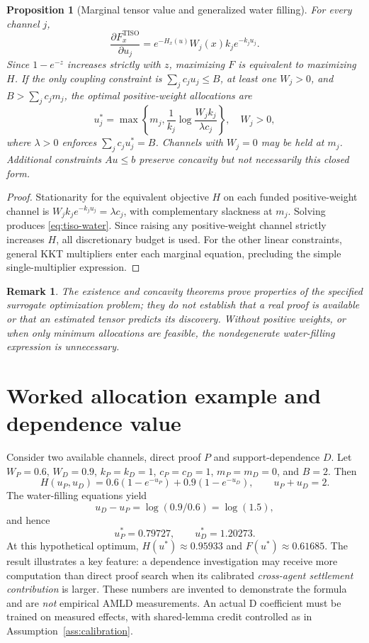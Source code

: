 \documentclass[11pt]{article}
\newtheorem{proposition}[definition]{Proposition}
\newtheorem{remark}[definition]{Remark}
\begin{document}
\begin{proposition}[Marginal tensor value and generalized water filling]\label{prop:tiso-water}
For every channel $j$,
\begin{equation}\label{eq:tiso-gradient}
\frac{\partial F_x^{\mathrm{TISO}}}{\partial u_j}
=e^{-H_x(u)}W_j(x)k_je^{-k_ju_j}.
\end{equation}
Since $1-e^{-z}$ increases strictly with $z$, maximizing $F$ is equivalent to maximizing $H$. If the only coupling constraint is $\sum_jc_ju_j\le B$, at least one $W_j>0$, and $B>\sum_jc_jm_j$, the optimal positive-weight allocations are
\begin{equation}\label{eq:tiso-water}
\boxed{\quad u_j^*=\max\!\left\{m_j,\frac1{k_j}\log\frac{W_jk_j}{\lambda c_j}\right\},\quad W_j>0,\quad}
\end{equation}
where $\lambda>0$ enforces $\sum_jc_ju_j^*=B$. Channels with $W_j=0$ may be held at $m_j$. Additional constraints $Au\le b$ preserve concavity but not necessarily this closed form.
\end{proposition}
\begin{proof}
Stationarity for the equivalent objective $H$ on each funded positive-weight channel is $W_jk_je^{-k_ju_j}=\lambda c_j$, with complementary slackness at $m_j$. Solving produces \eqref{eq:tiso-water}. Since raising any positive-weight channel strictly increases $H$, all discretionary budget is used. For the other linear constraints, general KKT multipliers enter each marginal equation, precluding the simple single-multiplier expression.
\end{proof}

\begin{remark}
The existence and concavity theorems prove properties of the \emph{specified surrogate optimization problem}; they do not establish that a real proof is available or that an estimated tensor predicts its discovery. Without positive weights, or when only minimum allocations are feasible, the nondegenerate water-filling expression is unnecessary.
\end{remark}

\section{Worked allocation example and dependence value}\label{sec:example}
Consider two available channels, direct proof $P$ and support-dependence $D$. Let $W_P=0.6$, $W_D=0.9$, $k_P=k_D=1$, $c_P=c_D=1$, $m_P=m_D=0$, and $B=2$. Then
\[
H(u_P,u_D)=0.6(1-e^{-u_P})+0.9(1-e^{-u_D}),\qquad u_P+u_D=2.
\]
The water-filling equations yield
\[
u_D-u_P=\log(0.9/0.6)=\log(1.5),
\]
and hence
\[
\boxed{u_P^*=0.79727,\qquad u_D^*=1.20273.}
\]
At this hypothetical optimum, $H(u^*)\approx0.95933$ and $F(u^*)\approx0.61685$. The result illustrates a key feature: a dependence investigation may receive more computation than direct proof search when its calibrated \emph{cross-agent settlement contribution} is larger. These numbers are invented to demonstrate the formula and are \emph{not} empirical AMLD measurements. An actual D coefficient must be trained on measured effects, with shared-lemma credit controlled as in Assumption~\ref{ass:calibration}.
\end{document}
